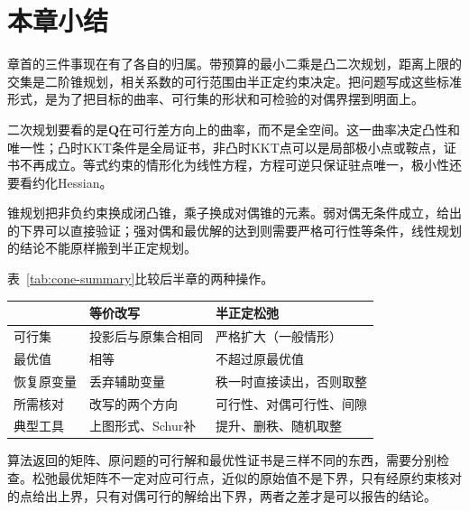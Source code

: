 \section{本章小结}
\label{sec:cone-summary}

章首的三件事现在有了各自的归属。带预算的最小二乘是凸二次规划，距离上限的交集是二阶锥规划，相关系数的可行范围由半正定约束决定。把问题写成这些标准形式，是为了把目标的曲率、可行集的形状和可检验的对偶界摆到明面上。

二次规划要看的是$\bm{Q}$在可行差方向上的曲率，而不是全空间。这一曲率决定凸性和唯一性；凸时KKT条件是全局证书，非凸时KKT点可以是局部极小点或鞍点，证书不再成立。等式约束的情形化为线性方程，方程可逆只保证驻点唯一，极小性还要看约化Hessian。

锥规划把非负约束换成闭凸锥，乘子换成对偶锥的元素。弱对偶无条件成立，给出的下界可以直接验证；强对偶和最优解的达到则需要严格可行性等条件，线性规划的结论不能原样搬到半正定规划。

表~\ref{tab:cone-summary}比较后半章的两种操作。

\begin{BookInlineTable}
  \centering
  \begin{tabular}{lll}
    \toprule
    & 等价改写 & 半正定松弛\\
    \midrule
    可行集 & 投影后与原集合相同 & 严格扩大（一般情形）\\
    最优值 & 相等 & 不超过原最优值\\
    恢复原变量 & 丢弃辅助变量 & 秩一时直接读出，否则取整\\
    所需核对 & 改写的两个方向 & 可行性、对偶可行性、间隙\\
    典型工具 & 上图形式、Schur补 & 提升、删秩、随机取整\\
    \bottomrule
  \end{tabular}
  \caption{等价改写与半正定松弛的对比。}
  \label{tab:cone-summary}
\end{BookInlineTable}

算法返回的矩阵、原问题的可行解和最优性证书是三样不同的东西，需要分别检查。松弛最优矩阵不一定对应可行点，近似的原始值不是下界，只有经原约束核对的点给出上界，只有对偶可行的解给出下界，两者之差才是可以报告的结论。
